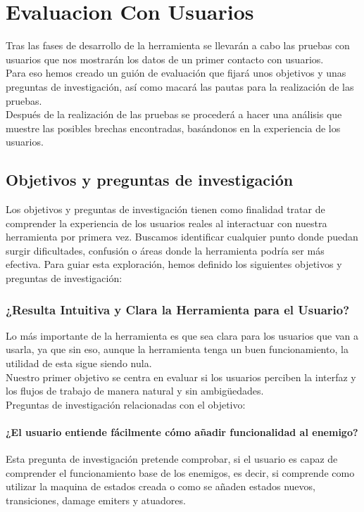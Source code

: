 \setcounter{secnumdepth}{3} %
\chapter{Evaluacion Con Usuarios}
\label{cap:evaluacionConUsuarios}
Tras las fases de desarrollo de la herramienta se llevarán a cabo las pruebas con usuarios que nos mostrarán los datos de un primer contacto con usuarios.\\
Para eso hemos creado un guión de evaluación que fijará unos objetivos y unas preguntas de investigación, así como macará las pautas para la realización de las pruebas. \\
Después de la  realización de las pruebas se procederá a hacer una análisis que muestre las posibles brechas encontradas, basándonos en la experiencia de los usuarios. 

\section{Objetivos y preguntas de investigación}
Los objetivos y preguntas de investigación tienen como finalidad tratar de comprender la experiencia de los usuarios reales al interactuar con nuestra herramienta por primera vez. Buscamos identificar cualquier punto donde puedan surgir dificultades, confusión o áreas donde la herramienta podría ser más efectiva. Para guiar esta exploración, hemos definido los siguientes objetivos y preguntas de investigación:

\subsection{¿Resulta  Intuitiva y Clara la Herramienta para el Usuario?}
Lo más importante de la herramienta es que sea clara para los usuarios que van a usarla, ya que sin eso, aunque la herramienta tenga un buen funcionamiento, la utilidad de esta sigue siendo nula.\\
Nuestro primer objetivo se centra en evaluar si los usuarios perciben la interfaz y los flujos de trabajo de manera natural y sin ambigüedades.\\
Preguntas de investigación relacionadas con el objetivo:
\subsubsection{¿El usuario entiende fácilmente cómo añadir funcionalidad al enemigo?}
Esta pregunta de investigación pretende comprobar, si el usuario es capaz de comprender el funcionamiento base de los enemigos, es decir, si comprende como  utilizar la maquina de estados creada o como se añaden estados nuevos, transiciones, damage emiters y atuadores.
